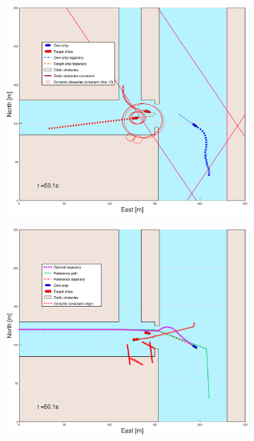 \begin{figure}[ht]\ContinuedFloat
    \begin{subfigure}[b]{0.49\textwidth}
        \centering
        \includegraphics[width=\textwidth]{Images/Figures/Havn1/_Simple_0fig1_time=50}
    \end{subfigure}
    \hfill
    \begin{subfigure}[b]{0.499\textwidth}
        \centering
        \includegraphics[width=\textwidth]{Images/Figures/Havn1/_Simple_0fig999_time=50}

\end{subfigure}
\end{figure}
